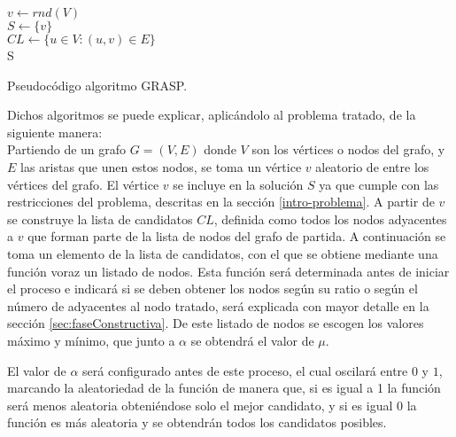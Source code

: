 \begin{algorithm}[H]
	\SetAlgoLined
	$ v \gets rnd( V ) $ \\[0.2cm]
	$ S \gets \{ v \} $ \\[0.2cm]
	$ CL \gets \{u \in V : (u, v) \in E\} $ \\[0.2cm]
	\Return S
	\caption{Pseudocódigo algoritmo GRASP.}
	\label{alg:grasp}
\end{algorithm}

Dichos algoritmos se puede explicar, aplicándolo al problema tratado, de la siguiente manera:\\
Partiendo de un grafo $G=(V, E)$ donde $V$ son los vértices o nodos del grafo, y $E$ las aristas que unen estos nodos, se toma un vértice $v$ aleatorio de entre los vértices del grafo. El vértice $v$ se incluye en la solución $S$ ya que cumple con las restricciones del problema, descritas en la sección \ref{intro-problema}. A partir de $v$ se construye la lista de candidatos $CL$, definida como todos los nodos adyacentes a $v$ que forman parte de la lista de nodos del grafo de partida. A continuación se toma un elemento de la lista de candidatos, con el que se obtiene mediante una función voraz un listado de nodos. Esta función será determinada antes de iniciar el proceso e indicará si se deben obtener los nodos según su ratio o según el número de adyacentes al nodo tratado, será explicada con mayor detalle en la sección \ref{sec:faseConstructiva}. De este listado de nodos se escogen los valores máximo y mínimo, que junto a $\alpha$ se obtendrá el valor de $\mu$.

El valor de $\alpha$ será configurado antes de este proceso, el cual oscilará entre $0$ y $1$, marcando la aleatoriedad de la función de manera que, si es igual a 1 la función será menos aleatoria obteniéndose solo el mejor candidato, y si es igual 0 la función es más aleatoria y se obtendrán todos los candidatos posibles.


